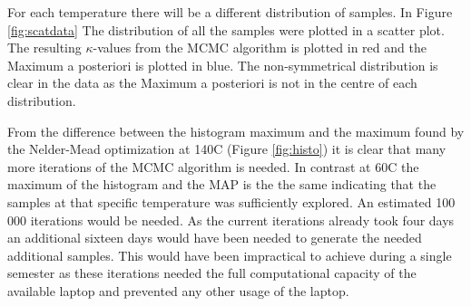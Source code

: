  For each temperature there will be a different distribution of samples. 
 In Figure \ref{fig:scatdata} The distribution of all the samples were plotted in a scatter plot.
 The resulting $\kappa$-values from the MCMC algorithm is plotted in red and the Maximum a posteriori is plotted in blue.
 The non-symmetrical distribution  is clear in the data as the Maximum a posteriori is not in the centre of each distribution.

From the difference between the histogram maximum and the maximum found by the Nelder-Mead optimization at 140\textdegree C (Figure \ref{fig:histo}) it is clear that many more iterations of the MCMC algorithm is needed.
In contrast at 60\textdegree C the maximum of the histogram and the MAP is the the same indicating that the samples at that specific temperature was sufficiently explored.
An estimated 100 000 iterations would be needed.
As the current iterations already took four days an additional sixteen days would have been needed to generate the needed additional samples.
This would have been impractical to achieve during a single semester as these iterations needed the full computational capacity of the available laptop and prevented any other usage of the laptop.

